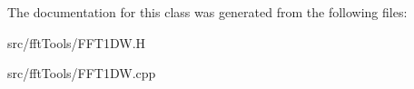 The documentation for this class was generated from the following files\+:\begin{DoxyCompactItemize}
\item 
src/fft\+Tools/F\+F\+T1\+D\+W.\+H\item 
src/fft\+Tools/F\+F\+T1\+D\+W.\+cpp\end{DoxyCompactItemize}
